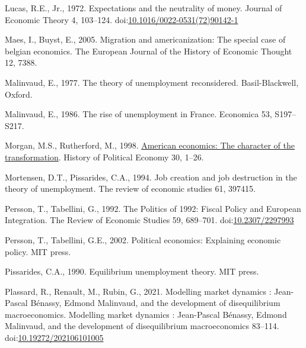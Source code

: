 \documentclass[]{elsarticle} %
\newlength{\cslhangindent}
\newlength{\cslentryspacingunit} %
\newenvironment{CSLReferences}[2] %
 {%
  \setlength{\parindent}{0pt}
  \ifodd #1
  \let\oldpar\par
  \def\par{\hangindent=\cslhangindent\oldpar}
  \fi
  \setlength{\parskip}{#2\cslentryspacingunit}
 }%
 {}
\begin{document}
\begin{CSLReferences}{1}{0}
\leavevmode{}%
Lucas, R.E., Jr., 1972. Expectations and the neutrality of money.
Journal of Economic Theory 4, 103--124.
doi:\href{https://doi.org/10.1016/0022-0531(72)90142-1}{10.1016/0022-0531(72)90142-1}

\leavevmode{}%
Maes, I., Buyst, E., 2005. Migration and americanization: The special
case of belgian economics. The European Journal of the History of
Economic Thought 12, 7388.

\leavevmode{}%
Malinvaud, E., 1977. The theory of unemployment reconsidered.
{Basil-Blackwell}, {Oxford}.

\leavevmode{}%
Malinvaud, E., 1986. The rise of unemployment in {France}. Economica 53,
S197--S217.

\leavevmode{}%
Morgan, M.S., Rutherford, M., 1998.
\href{http://search.ebscohost.com/login.aspx?direct=true\&db=bth\&AN=7752144\&lang=fr\&site=ehost-live}{American
economics: The character of the transformation}. History of Political
Economy 30, 1--26.

\leavevmode{}%
Mortensen, D.T., Pissarides, C.A., 1994. Job creation and job
destruction in the theory of unemployment. The review of economic
studies 61, 397415.

\leavevmode{}%
Persson, T., Tabellini, G., 1992. The {Politics} of 1992: {Fiscal
Policy} and {European Integration}. The Review of Economic Studies 59,
689--701. doi:\href{https://doi.org/10.2307/2297993}{10.2307/2297993}

\leavevmode{}%
Persson, T., Tabellini, G.E., 2002. Political economics: Explaining
economic policy. {MIT press}.

\leavevmode{}%
Pissarides, C.A., 1990. Equilibrium unemployment theory. MIT press.

\leavevmode{}%
Plassard, R., Renault, M., Rubin, G., 2021. Modelling market dynamics :
{Jean-Pascal Bénassy}, {Edmond Malinvaud}, and the development of
disequilibrium macroeconomics. Modelling market dynamics : Jean-Pascal
Bénassy, Edmond Malinvaud, and the development of disequilibrium
macroeconomics 83--114.
doi:\href{https://doi.org/10.19272/202106101005}{10.19272/202106101005}


\end{CSLReferences}
\end{document}
